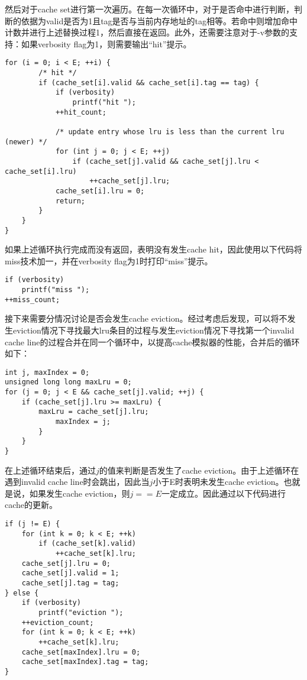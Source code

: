 \par 然后对于cache set进行第一次遍历。在每一次循环中，对于是否命中进行判断，判断的依据为valid是否为1且tag是否与当前内存地址的tag相等。若命中则增加命中计数并进行上述替换过程1，然后直接在返回。此外，还需要注意对于-v参数的支持：如果verbosity flag为1，则需要输出``hit''提示。
\begin{lstlisting}
for (i = 0; i < E; ++i) {
        /* hit */
        if (cache_set[i].valid && cache_set[i].tag == tag) {
            if (verbosity)
                printf("hit ");
            ++hit_count;

            /* update entry whose lru is less than the current lru (newer) */
            for (int j = 0; j < E; ++j)
                if (cache_set[j].valid && cache_set[j].lru < cache_set[i].lru)
                    ++cache_set[j].lru;
            cache_set[i].lru = 0;
            return;
        }
    }
}
\end{lstlisting}

\par 如果上述循环执行完成而没有返回，表明没有发生cache hit，因此使用以下代码将miss技术加一，并在verbosity flag为1时打印``miss''提示。
\begin{lstlisting}
if (verbosity)
    printf("miss ");
++miss_count;
\end{lstlisting}

\par 接下来需要分情况讨论是否会发生cache eviction。经过考虑后发现，可以将不发生eviction情况下寻找最大lru条目的过程与发生eviction情况下寻找第一个invalid cache line的过程合并在同一个循环中，以提高cache模拟器的性能，合并后的循环如下：
\begin{lstlisting}
int j, maxIndex = 0;
unsigned long long maxLru = 0;
for (j = 0; j < E && cache_set[j].valid; ++j) {
    if (cache_set[j].lru >= maxLru) {
        maxLru = cache_set[j].lru;
            maxIndex = j;
        }
    }
}
\end{lstlisting}

\par 在上述循环结束后，通过$j$的值来判断是否发生了cache eviction。由于上述循环在遇到invalid cache line时会跳出，因此当$j$小于E时表明未发生cache eviction。也就是说，如果发生cache eviction，则$j==E$一定成立。因此通过以下代码进行cache的更新。
\begin{lstlisting}
if (j != E) {
    for (int k = 0; k < E; ++k)
        if (cache_set[k].valid)
            ++cache_set[k].lru;
    cache_set[j].lru = 0;
    cache_set[j].valid = 1;
    cache_set[j].tag = tag;
} else {
    if (verbosity)
        printf("eviction ");
    ++eviction_count;
    for (int k = 0; k < E; ++k)
        ++cache_set[k].lru;
    cache_set[maxIndex].lru = 0;
    cache_set[maxIndex].tag = tag;
}
\end{lstlisting}

